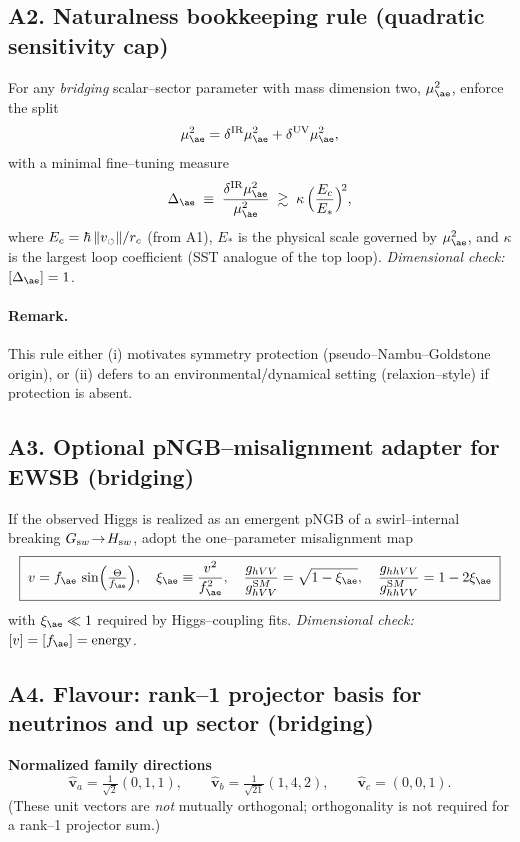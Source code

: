 \documentclass[11pt]{article}
\begin{document}
      \subsection*{A2. Naturalness bookkeeping rule (quadratic sensitivity cap)}
          For any \emph{bridging} scalar–sector parameter with mass dimension two, $\mu_{\ae}^2$, enforce the split
          \[
              \mu_{\ae}^2=\delta^{\mathrm{IR}}\mu_{\ae}^2+\delta^{\mathrm{UV}}\mu_{\ae}^2,
          \]
          with a minimal fine–tuning measure
          \[
              \Delta_{\ae}\;\equiv\;\frac{\delta^{\mathrm{IR}}\mu_{\ae}^2}{\mu_{\ae}^2}
              \;\gtrsim\; \kappa\,\Big(\frac{E_c}{E_*}\Big)^{\!2},
          \]
          where $E_c=\hbar\,\|\mathbf \mathbf{v}_{\scriptscriptstyle\boldsymbol{\circlearrowleft}}\|/r_c$ (from A1), $E_*$ is the physical scale governed by $\mu_{\ae}^2$, and $\kappa$ is the largest loop coefficient (SST analogue of the top loop). \textit{Dimensional check:} $[\Delta_{\ae}]=1$.

          \paragraph{Remark.} This rule either (i) motivates symmetry protection (pseudo–Nambu–Goldstone origin), or (ii) defers to an environmental/dynamical setting (relaxion–style) if protection is absent.

  \subsection*{A3. Optional pNGB–misalignment adapter for EWSB (bridging)}
      If the observed Higgs is realized as an emergent pNGB of a swirl–internal breaking $G_{\textrm sw}\!\to\! H_{\textrm sw}$, adopt the one–parameter misalignment map
      \[
          \boxed{\;
          v=f_{\ae}\,\sin\!\Big(\tfrac{\Theta}{f_{\ae}}\Big),\quad \xi_{\ae}\equiv\frac{v^2}{f_{\ae}^2},\quad
          \frac{g_{hVV}}{g_{hVV}^{\textrm SM}}=\sqrt{1-\xi_{\ae}},\quad
          \frac{g_{hhVV}}{g_{hhVV}^{\textrm SM}}=1-2\xi_{\ae} \;}
      \]
      with $\xi_{\ae}\ll1$ required by Higgs–coupling fits. \textit{Dimensional check:} $[v]=[f_{\ae}]=\mathrm{energy}$.

  \subsection*{A4. Flavour: rank–1 projector basis for neutrinos and up sector (bridging)}

      \textbf{Normalized family directions}
      \[
          \hat{\mathbf v}_a=\tfrac{1}{\sqrt{2}}(0,1,1),\qquad
          \hat{\mathbf v}_b=\tfrac{1}{\sqrt{21}}(1,4,2),\qquad
          \hat{\mathbf v}_c=(0,0,1).
      \]
      (These unit vectors are \emph{not} mutually orthogonal; orthogonality is not required for a rank–1 projector sum.)
\end{document}
